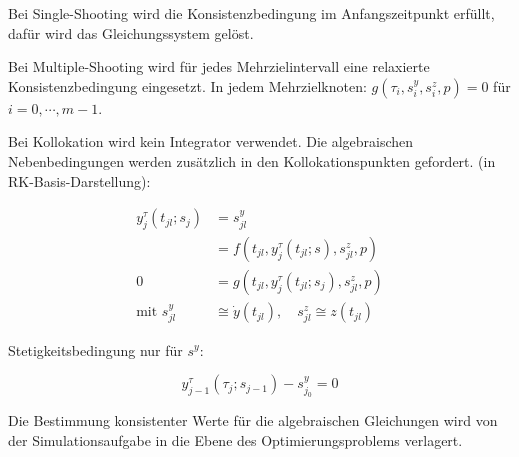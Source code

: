 Bei Single-Shooting wird die Konsistenzbedingung im Anfangszeitpunkt erfüllt, dafür wird das Gleichungssystem gelöst.

Bei Multiple-Shooting wird für jedes Mehrzielintervall eine relaxierte Konsistenzbedingung eingesetzt. In jedem Mehrzielknoten: $g(\tau_i, s_i^y, s_i^z, p)=0$ für $i=0,\cdots,m-1$.

Bei Kollokation wird kein Integrator verwendet. Die algebraischen Nebenbedingungen werden zusätzlich in den Kollokationspunkten gefordert. (in RK-Basis-Darstellung):

\begin{align*}
y_j^\tau (t_{jl}; s_j) &= s_{jl}^y \\
&= f(t_{jl}, y_j^\tau(t_{jl};s), s_{jl}^z,p) \\
0 &= g(t_{jl}, y_j^\tau(t_{jl}; s_j), s_{jl}^z, p) \\
\text{mit } s_{jl}^y & \cong \dot y(t_{jl}), \quad s_{jl}^z \cong z(t_{jl})
\end{align*}

Stetigkeitsbedingung nur für $s^y$:

\[ y_{j-1}^\tau (\tau_j; s_{j-1})-s_{j_0}^y = 0 \]

Die Bestimmung konsistenter Werte für die algebraischen Gleichungen wird von der Simulationsaufgabe in die Ebene des Optimierungsproblems verlagert.






